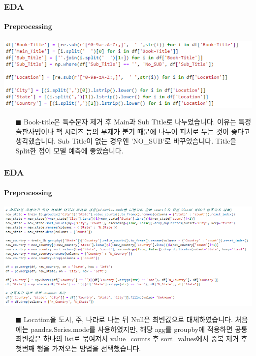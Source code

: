 \documentclass{beamer}
\begin{document}
\begin{frame}
\frametitle{EDA}
\framesubtitle{Preprocessing}

\centering
\includegraphics[scale=0.6]{title, location split.png}

\begin{itemize}
\item[$\blacksquare$] {\footnotesize Book-title은 특수문자 제거 후 Main과 Sub Title로 나누었습니다. 이유는 특정 출판사명이나 책 시리즈 등의 부제가 붙기 때문에 나누어 피쳐로 두는 것이 좋다고 생각했습니다. Sub Title이 없는 경우엔 'NO\_SUB'로 바꾸었습니다. Title을 Split한 점이 모델 예측에 좋았습니다.} 

\end{itemize}
\end{frame}

\begin{frame}[fragile]
\frametitle{EDA}
\framesubtitle{Preprocessing}

\centering
\includegraphics[scale=0.45]{location split.png}

\begin{itemize}
\item[$\blacksquare$] {\footnotesize Location을 도시, 주, 나라로 나눈 뒤 Null은 최빈값으로 대체하였습니다. 처음에는 pandas.Series.mode를 사용하였지만, 해당 agg를 groupby에 적용하면 공통 최빈값은 하나의 list로 묶여져서 value\_counts 후 sort\_values에서 중복 제거 후 첫번째 행을 가져오는 방법을 선택했습니다.} 

\end{itemize}
\end{frame}
\end{document}
